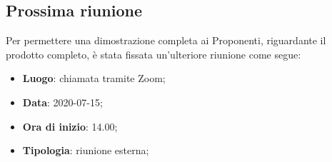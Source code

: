 \subsection{Prossima riunione}
Per permettere una dimostrazione completa ai Proponenti, riguardante il prodotto\textit{} completo, è stata fissata un'ulteriore riunione come segue: 
\begin{itemize}
	\item \textbf{Luogo}: chiamata tramite Zoom; 
	\item \textbf{Data}: 2020-07-15; 
	\item \textbf{Ora di inizio}: 14.00; 
	\item \textbf{Tipologia}: riunione esterna; 
\end{itemize}